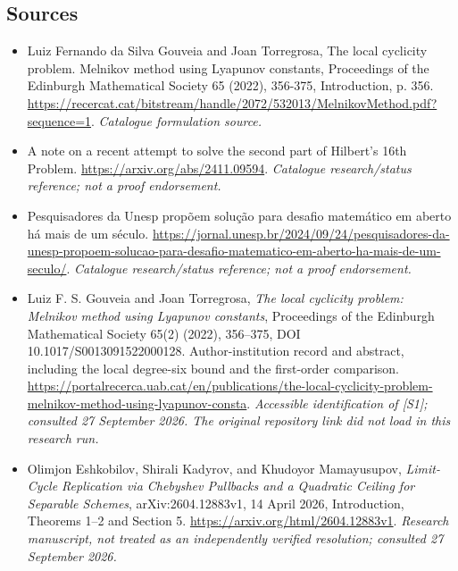 \documentclass[11pt,a4paper]{article}
\numberwithin{equation}{section}
\begin{document}
\subsection{Sources}
\begin{itemize}\raggedright
\item[\textnormal{[S1]}]\hypertarget{source:40:1}{} Luiz Fernando da Silva Gouveia and Joan Torregrosa, The local cyclicity problem. Melnikov method using Lyapunov constants, Proceedings of the Edinburgh Mathematical Society 65 (2022), 356-375, Introduction, p. 356.
\url{https://recercat.cat/bitstream/handle/2072/532013/MelnikovMethod.pdf?sequence=1}.
{\small\textit{Catalogue formulation source.}}
\item[\textnormal{[S2]}]\hypertarget{source:40:2}{} A note on a recent attempt to solve the second part of Hilbert's 16th Problem.
\url{https://arxiv.org/abs/2411.09594}.
{\small\textit{Catalogue research/status reference; not a proof endorsement.}}
\item[\textnormal{[S3]}]\hypertarget{source:40:3}{} Pesquisadores da Unesp propõem solução para desafio matemático em aberto há mais de um século.
\url{https://jornal.unesp.br/2024/09/24/pesquisadores-da-unesp-propoem-solucao-para-desafio-matematico-em-aberto-ha-mais-de-um-seculo/}.
{\small\textit{Catalogue research/status reference; not a proof endorsement.}}
\item[\textnormal{[E1]}]\hypertarget{extra:40:1}{} Luiz F. S. Gouveia and Joan Torregrosa,
\emph{The local cyclicity problem: Melnikov method using Lyapunov constants},
Proceedings of the Edinburgh Mathematical Society 65(2) (2022), 356--375,
DOI 10.1017/S0013091522000128. Author-institution record and abstract,
including the local degree-six bound and the first-order comparison.
\url{https://portalrecerca.uab.cat/en/publications/the-local-cyclicity-problem-melnikov-method-using-lyapunov-consta}.
{\small\textit{Accessible identification of [S1]; consulted 27 September 2026.
The original repository link did not load in this research run.}}
\item[\textnormal{[E2]}]\hypertarget{extra:40:2}{} Olimjon Eshkobilov, Shirali Kadyrov,
and Khudoyor Mamayusupov, \emph{Limit-Cycle Replication via Chebyshev Pullbacks
and a Quadratic Ceiling for Separable Schemes}, arXiv:2604.12883v1,
14 April 2026, Introduction, Theorems 1--2 and Section 5.
\url{https://arxiv.org/html/2604.12883v1}.
{\small\textit{Research manuscript, not treated as an independently verified
resolution; consulted 27 September 2026.}}
\end{itemize}
\end{document}
